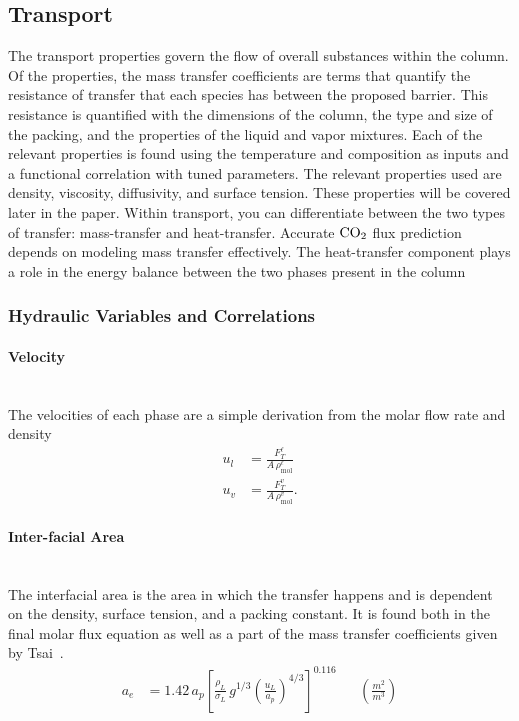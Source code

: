 \documentclass[a4paper,fleqn]{cas-sc}
\newcommand{\COtwo}{{\ce{CO2}}}
\newcommand{\liq}{\ell}
\newcommand{\vap}{v}
\begin{document}
    \subsection{Transport}\label{subsec:transport}
    The transport properties govern the flow of overall substances within the column. Of the properties, the mass transfer coefficients are terms that quantify the resistance of transfer that each species has between the proposed barrier. This resistance is quantified with the dimensions of the column, the type and size of the packing, and the properties of the liquid and vapor mixtures. Each of the relevant properties is found using the temperature and composition as inputs and a functional correlation with tuned parameters. The relevant properties used are density, viscosity, diffusivity, and surface tension. These properties will be covered later in the paper. Within transport, you can differentiate between the two types of transfer: mass-transfer and heat-transfer. Accurate $\COtwo$ flux prediction depends on modeling mass transfer effectively. The heat-transfer component plays a role in the energy balance between the two phases present in the column

    \subsubsection{Hydraulic Variables and Correlations}
    \paragraph{Velocity}\mbox{}\\[0.5em]
    The velocities of each phase are a simple derivation from the molar flow rate and density
    \begin{align}
        u_l &= \frac{F^{\liq}_{T}}{A \,\rho^{\liq}_{ \text{mol}}} \\
        u_v &= \frac{F^{\vap}_{T}}{A \,\rho^{\vap}_{ \text{mol}}}.
    \end{align}

    \paragraph{Inter-facial Area}\mbox{}\\[0.5em]
    The interfacial area is the area in which the transfer happens and is dependent on the density, surface tension, and a packing constant. It is found both in the final molar flux equation as well as a part of the mass transfer coefficients given by Tsai~\cite{Tsai2010}.
    \begin{align}
        a_e
        &= 1.42\,a_p\left[\frac{\rho_L}{\sigma_L}\,g^{1/3}\left(\frac{u_L}{a_p}\right)^{4/3}\right]^{0.116} && \left(\frac{\unit{m}^2}{\unit{m}^3} \right)
    \end{align}
\end{document}
